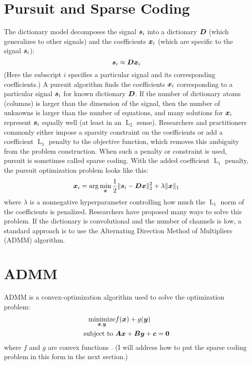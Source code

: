 \section{Pursuit and Sparse Coding}
\label{section:sparse coding}
The dictionary model decomposes the signal $\bm{s}_i$ into a dictionary $\bm{D}$ (which generalizes to other signals) and the coefficients $\bm{x}_i$ (which are specific to the signal $\bm{s}_i$):
%
\begin{equation}
\bm{s}_i \approx \bm{D}\bm{x}_i
\end{equation}
%
(Here the subscript $i$ specifies a particular signal and its corresponding coefficients.) A pursuit algorithm finds the coefficients $\bm{x}_i$ corresponding to a particular signal $\bm{s}_i$ for known dictionary $\bm{D}$. If the number of dictionary atoms (columns) is larger than the dimension of the signal, then the number of unknowns is larger than the number of equations, and many solutions for $\bm{x}_i$ represent $\bm{s}_i$ equally well (at least in an $\operatorname{L}_2$ sense). Researchers and practitioners commonly either impose a sparsity constraint on the coefficients or add a coefficient $\operatorname{L}_1$ penalty to the objective function, which removes this ambiguity from the problem construction. When such a penalty or constraint is used, pursuit is sometimes called sparse coding. With the added coefficient $\operatorname{L}_1$ penalty, the pursuit optimization problem looks like this:
%
\begin{equation}\label{equation:sparse coding}
\bm{x}_i = \arg\min_{\bm{x}} \frac{1}{2}\|\bm{s}_i - \bm{D}\bm{x}\|_2^2 + \lambda \|\bm{x}\|_1
\end{equation}
%
where $\lambda$ is a nonnegative hyperparameter controlling how much the $\operatorname{L}_1$ norm of the coefficients is penalized. Researchers have proposed many ways to solve this problem. If the dictionary is convolutional and the number of channels is low, a standard approach is to use the Alternating Direction Method of Multipliers (ADMM) algorithm.

\section{ADMM}
\label{section:ADMM}
ADMM is a convex-optimization algorithm used to solve the optimization problem:
\begin{equation} \label{equation:ADMM}
\begin{aligned}
\operatorname*{\text{minimize}}_{\bm{x},\bm{y}} & f(\bm{x}) + g(\bm{y}) \\
\text{subject to } & \bm{A}\bm{x} + \bm{B}\bm{y} + \bm{c} = \bm{0} 
\end{aligned}
\end{equation}
%
where $f$ and $g$ are convex functions \cite{boyd2011distributed}. (I will address how to put the sparse coding problem in this form in the next section.)

